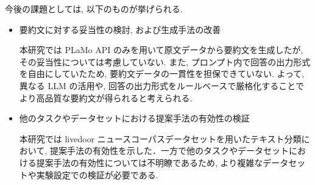 \documentclass[twocolumn]{jarticle}
\begin{document}
今後の課題としては, 以下のものが挙げられる.
\begin{itemize}
  \item 要約文に対する妥当性の検討, および生成手法の改善\par
  \indent 本研究では PLaMo API のみを用いて原文データから要約文を生成したが, その妥当性については考慮していない. また, プロンプト内で回答の出力形式を自由にしていたため, 要約文データの一貫性を担保できていない. よって, 異なる LLM の活用や, 回答の出力形式をルールベースで厳格化することでより高品質な要約文が得られると考えられる.
  \item 他のタスクやデータセットにおける提案手法の有効性の検証\par
  \indent 本研究では livedoor ニュースコーパスデータセットを用いたテキスト分類において, 提案手法の有効性を示した．一方で他のタスクやデータセットにおける提案手法の有効性については不明瞭であるため, より複雑なデータセットや実験設定での検証が必要である.
\end{itemize}



\end{document}
